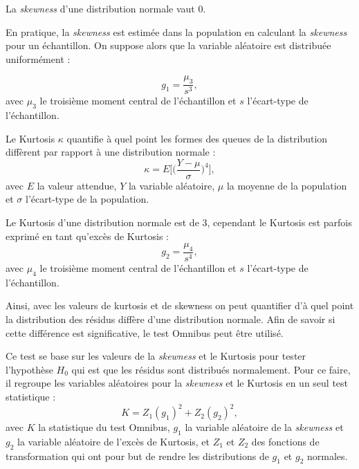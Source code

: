 La \textit{skewness} d'une distribution normale vaut 0.

En pratique, la \textit{skewness} est estimée dans la population en calculant la \textit{skewness} pour un échantillon. On suppose alors
que la variable aléatoire est distribuée uniformément :

\begin{equation}
\label{eq:factors_skewness_estimation}
g_{1} = \frac{ \mu_{3} } {s^3},
\end{equation}
avec $\mu_{3}$ le troisième moment central de l'échantillon et $s$ l'écart-type de l'échantillon.

Le Kurtosis $\kappa$ quantifie à quel point les formes des queues de la distribution diffèrent par rapport à une distribution normale :
\begin{equation}
\label{eq:factors_kurtosis}
\kappa = E \Big[ \Big(\frac{ Y - \mu }{ \sigma }\Big)^{4} \Big], 
\end{equation}
avec $E$ la valeur attendue, $Y$ la variable aléatoire, $\mu$ la moyenne de la population et $\sigma$ l'écart-type de la population.

Le Kurtosis d'une distribution normale est de 3, cependant le Kurtosis est parfois exprimé en tant qu'excès de Kurtosis :
\begin{equation}
\label{eq:factors_kurtosis_excess}
g_{2} = \frac{ \mu_{4} } {s^4}, 
\end{equation}
avec $\mu_{4}$ le troisième moment central de l'échantillon et $s$ l'écart-type de l'échantillon.

Ainsi, avec les valeurs de kurtosis et de skewness on peut quantifier d'à quel point la distribution des résidus diffère 
d'une distribution normale. Afin de savoir si cette différence est significative, le test Omnibus peut être utilisé. 

Ce test se base sur les valeurs de la \textit{skewness} et le Kurtosis pour tester l'hypothèse $H_{0}$ qui est que les résidus sont distribués normalement.
Pour ce faire, il regroupe les variables aléatoires pour la \textit{skewness} et le Kurtosis en un seul test statistique :
\begin{equation}
\label{eq:factors_omnibus_statistic}
K = Z_{1}(g_{1})^2 + Z_{2}(g_{2})^2, 
\end{equation}
avec $K$ la statistique du test Omnibus, $g_{1}$ la variable aléatoire de la \textit{skewness} et
$g_{2}$ la variable aléatoire de l'excès de Kurtosis, et $Z_{1}$ et $Z_{2}$ des fonctions de transformation qui ont pour but de rendre 
les distributions de $g_{1}$ et $g_{2}$ normales.

